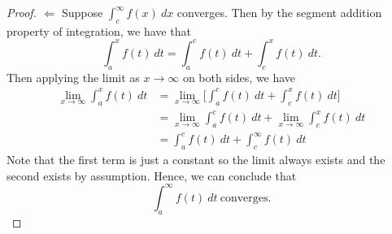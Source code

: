 \documentclass[a4paper]{article}
\begin{document}
\begin{proof}
    \( \Longleftarrow \) Suppose \( \int_{ c }^{ \infty  } f(x) \ dx   \) converges. Then by the segment addition property of integration, we have that 
    \[  \int_{ a }^{ x }  f(t) \ dt = \int_{ a }^{ c  }  f(t) \ dt + \int_{ c  }^{ x  }  f(t) \ dt.  \]
    Then applying the limit as \( x \to \infty    \) on both sides, we have 
    \begin{align*}
        \lim_{ x \to \infty  }  \int_{ a }^{ x } f(t)   \ dt &= \lim_{ x \to \infty  }  \Big[ \int_{ a }^{ c  }  f(t) \ dt + \int_{ c }^{ x  }  f(t) \ dt \Big] \\
                                                             &= \lim_{ x \to \infty  }  \int_{ a }^{ c  }  f(t) \ dt + \lim_{ x \to \infty  }  \int_{ c }^{ x }  f(t) \ dt \\
                                                             &= \int_{ a }^{ c } f(t) \ dt + \int_{ c }^{ \infty  } f(t) \ dt
    \end{align*}
    Note that the first term is just a constant so the limit always exists and the second exists by assumption. Hence, we can conclude that 
    \[  \int_{ a }^{ \infty  } f(t) \ dt \ \text{converges}. \]
\end{proof}
\end{document}
